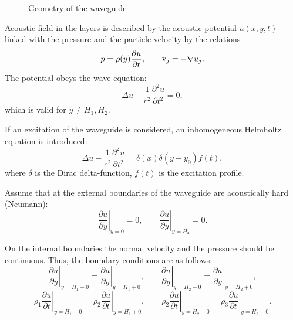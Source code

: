 \documentclass[12pt]{article}
\newcommand{\ptl}{\partial}
\begin{document}
\begin{figure}[ht]
\centerline{}
\caption{Geometry of the waveguide}
\label{fig01}
\end{figure}

Acoustic field in the layers is described by the acoustic potential $u (x,y,t)$
linked with the pressure and the particle velocity by the relations 
\begin{equation}
p = \rho(y) \frac{\ptl u}{\ptl t},
\qquad 
{\rm v}_j = - \nabla u_j.
\label{eq0101}
\end{equation} 
The potential obeys the wave equation: 
\begin{equation}
\Delta u - \frac{1}{c^2} \frac{\ptl^2 u}{\ptl t^2} = 0 , 
\label{eq0102}
\end{equation}
which is valid for $y \ne H_1, H_2$.


If an excitation of the waveguide is considered, an inhomogeneous 
Helmholtz equation is introduced:  
\begin{equation}
\Delta u - \frac{1}{c^2} \frac{\ptl^2 u}{\ptl t^2}= \delta(x) \delta(y-y_0) f(t), 
\label{eq0104}
\end{equation}
where $\delta$ is the Dirac delta-function, $f(t)$ is the excitation profile.  

Assume that at the external boundaries of the waveguide are acoustically hard (Neumann):
\begin{equation}
\left. \frac{\ptl u }{\ptl y} \right|_{y = 0}= 0, 
\qquad 
\left. \frac{\ptl u }{\ptl y} \right|_{y = H_3}= 0. 
\label{eq0103}
\end{equation}


On the internal boundaries the normal velocity and the pressure should be continuous. 
Thus, the boundary conditions are as follows: 
\begin{equation}
\left. \frac{\ptl u }{\ptl y} \right|_{y = H_1-0} = 
\left. \frac{\ptl u }{\ptl y} \right|_{y = H_1+0} ,
\qquad 
\left. \frac{\ptl u }{\ptl y} \right|_{y = H_2-0} = 
\left. \frac{\ptl u }{\ptl y} \right|_{y = H_2+0} ,
\label{eq0105}
\end{equation}
\begin{equation}
\left. \rho_1 \frac{\ptl u }{\ptl t} \right|_{y = H_1-0} = 
\left. \rho_2 \frac{\ptl u }{\ptl t} \right|_{y = H_1+0} ,
\qquad 
\left. \rho_2 \frac{\ptl u }{\ptl t} \right|_{y = H_2-0} = 
\left. \rho_3 \frac{\ptl u }{\ptl t} \right|_{y = H_2+0} .
\label{eq0106}
\end{equation}
\end{document}
